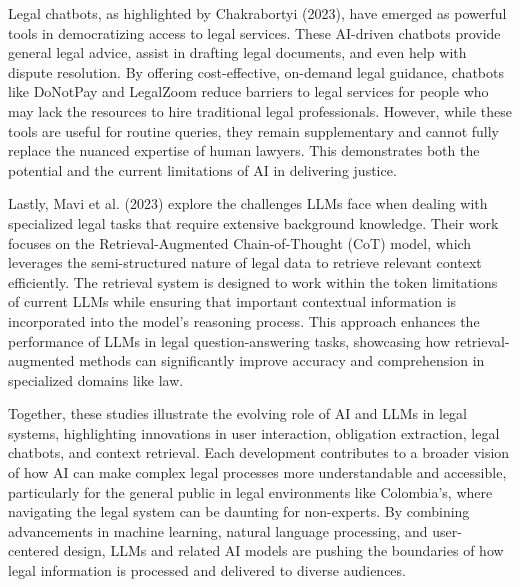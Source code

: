 Legal chatbots, as highlighted by Chakrabortyi (2023), 
have emerged as powerful tools in democratizing access to legal services.
These AI-driven chatbots provide general legal advice, assist in drafting 
legal documents, and even help with dispute resolution. By offering 
cost-effective, on-demand legal guidance, chatbots like DoNotPay and 
LegalZoom reduce barriers to legal services for people who may lack 
the resources to hire traditional legal professionals. However, 
while these tools are useful for routine queries, they remain 
supplementary and cannot fully replace the nuanced expertise of human 
lawyers. This demonstrates both the potential and the current 
limitations of AI in delivering justice.

Lastly, Mavi et al. (2023) explore the challenges LLMs face when dealing 
with specialized legal tasks that require extensive background knowledge. 
Their work focuses on the Retrieval-Augmented Chain-of-Thought (CoT) 
model, which leverages the semi-structured nature of legal data to 
retrieve relevant context efficiently. The retrieval system is designed 
to work within the token limitations of current LLMs while ensuring 
that important contextual information is incorporated into the model’s 
reasoning process. This approach enhances the performance of LLMs in 
legal question-answering tasks, showcasing how retrieval-augmented 
methods can significantly improve accuracy and comprehension in 
specialized domains like law.

Together, these studies illustrate the evolving role of AI and LLMs in 
legal systems, highlighting innovations in user interaction, obligation 
extraction, legal chatbots, and context retrieval. Each development 
contributes to a broader vision of how AI can make complex legal processes 
more understandable and accessible, particularly for the general public 
in legal environments like Colombia's, where navigating the legal system 
can be daunting for non-experts. By combining advancements in machine 
learning, natural language processing, and user-centered design, LLMs and 
related AI models are pushing the boundaries of how legal information is 
processed and delivered to diverse audiences.

\endinput